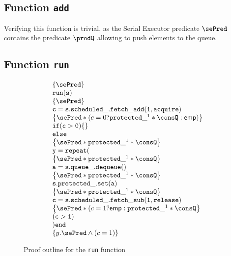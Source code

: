 \subsection{Function \texttt{add}}
Verifying this function is trivial, as the Serial Executor predicate $\sePred$ contains the predicate $\prodQ$ allowing to push elements to the queue.

\subsection{Function \texttt{run}}

\begin{figure}
\begin{equation*}
		\begin{array}{l}
		\left\{\sePred \right\} \\
		\mathtt{run(s)} \\
		\left\{\sePred \right\} \\
		\mathtt{c = s.scheduled\_.fetch\_add(1, acquire)} \\
		\left\{ \sePred * (c = 0 ? \mathtt{protected\_}^1 * \consQ : \mathsf{emp}) \right\}\\
		\mathtt{if(c > 0) \{\}}\\
		\mathtt{else} \\
		\left\{ \sePred * \mathtt{protected\_}^1 * \consQ \right\} \\
		\mathtt{y = repeat (} \\
		\left\{ \sePred * \mathtt{protected\_}^1 * \consQ \right\} \\
		\mathtt{a = s.queue\_.dequeue()} \\
		\left\{ \sePred * \mathtt{protected\_}^1 * \consQ \right\} \\
		\mathtt{s.protected\_.set(a)} \\
		\left\{ \sePred * \mathtt{protected\_}^1 * \consQ \right\} \\
		\mathtt{c = s.scheduled\_.fetch\_sub(1, release)}\\	
		\left\{ \sePred * (c = 1 ? \mathsf{emp} : \mathtt{protected\_}^1 * \consQ \right\} \\
		\mathtt{(c > 1)}\\
		\mathtt{) end}\\
		\left\{ y. \sePred \land (c = 1) \right\}
\end{array}
\end{equation*}

		\caption{Proof outline for the \texttt{run} function}
		\label{fig:run}
\end{figure}

